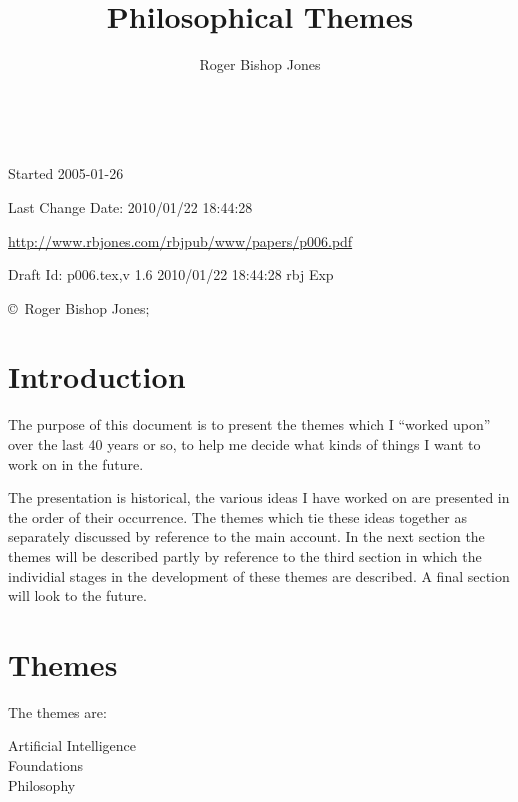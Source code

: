 \documentclass[10pt,titlepage]{book}
\title{Philosophical Themes}
\author{Roger Bishop Jones}
\date{\ }
\begin{document}
\frontmatter

\begin{titlepage}
\maketitle

\vfill


\begin{centering}
\footnotesize{
Started 2005-01-26

Last Change $ $Date: 2010/01/22 18:44:28 $ $

\href{http://www.rbjones.com/rbjpub/www/papers/p006.pdf}{http://www.rbjones.com/rbjpub/www/papers/p006.pdf}

Draft $ $Id: p006.tex,v 1.6 2010/01/22 18:44:28 rbj Exp $ $

\copyright\ Roger Bishop Jones;

}%
\end{centering}

\thispagestyle{empty}
\end{titlepage}

{\parskip=0pt\tableofcontents}


\mainmatter
\chapter{Introduction}

The purpose of this document is to present the themes which I ``worked upon'' over the last 40 years or so, to help me decide what kinds of things I want to work on in the future.

The presentation is historical, the various ideas I have worked on are presented in the order of their occurrence.
The themes which tie these ideas together as separately discussed by reference to the main account.
In the next section the themes will be described partly by reference to the third section in which the individial stages in the development of these themes are described.
A final section will look to the future.

\chapter{Themes}

The themes are:
\begin{description}
\item[Artificial Intelligence]
\item[Foundations]
\item[Philosophy]
\end{description}
\end{document}

